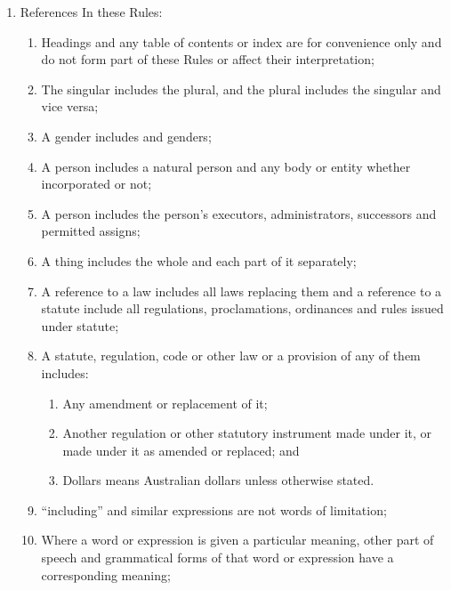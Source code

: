 \documentclass{article}
\begin{document}
\begin{enumerate}[label=\arabic*.]
\begin{enumerate}[label=\arabic{enumi}.\arabic*.]
\begin{enumerate}[label=\arabic{enumi}.\arabic*.]
\item  References In these Rules:

\begin{enumerate}[label=(\arabic*)]

\item  Headings and any table of contents or index are for convenience only and do not form part of these Rules or affect their interpretation;

\item  The singular includes the plural, and the plural includes the singular and vice versa;

\item  A gender includes and genders;

\item  A person includes a natural person and any body or entity whether incorporated or not;

\item  A person includes the person’s executors, administrators, successors and permitted assigns;

\item  A thing includes the whole and each part of it separately;

\item  A reference to a law includes all laws replacing them and a reference to a statute include all regulations, proclamations, ordinances and rules issued under statute;

\item  A statute, regulation, code or other law or a provision of any of them includes:

\begin{enumerate}[label=(\alph*)]

\item  Any amendment or replacement of it;

\item  Another regulation or other statutory instrument made under it, or made under it as amended or replaced; and

\item  Dollars means Australian dollars unless otherwise stated.

\end{enumerate}

\item  “including” and similar expressions are not words of limitation;

\item  Where a word or expression is given a particular meaning, other part of speech and grammatical forms of that word or expression have a corresponding meaning;


\end{enumerate}
\end{enumerate}
\end{enumerate}
\end{enumerate}
\end{document}
